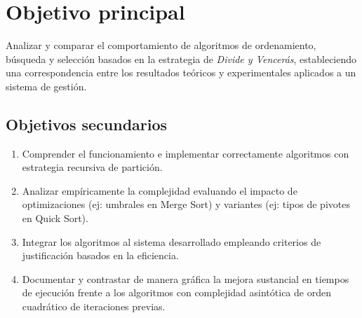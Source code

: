 \section{Objetivo principal}\label{sec:objetivos}
Analizar y comparar el comportamiento de algoritmos de ordenamiento, búsqueda y selección basados en la estrategia de \textit{Divide y Vencerás}, estableciendo una correspondencia entre los resultados teóricos y experimentales aplicados a un sistema de gestión.

\subsection{Objetivos secundarios}\label{sec:objetivos_secundarios}
\begin{enumerate}
    \item Comprender el funcionamiento e implementar correctamente algoritmos con estrategia recursiva de partición.
    \item Analizar empíricamente la complejidad evaluando el impacto de optimizaciones (ej: umbrales en Merge Sort) y variantes (ej: tipos de pivotes en Quick Sort).
    \item Integrar los algoritmos al sistema desarrollado empleando criterios de justificación basados en la eficiencia.
    \item Documentar y contrastar de manera gráfica la mejora sustancial en tiempos de ejecución frente a los algoritmos con complejidad asintótica de orden cuadrático de iteraciones previas.
\end{enumerate}
